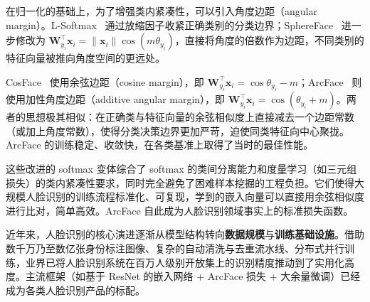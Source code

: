 在归一化的基础上，为了增强类内紧凑性，可以引入角度边距（angular margin）。L-Softmax~\cite{liu2017largemarginsoftmaxlossconvolutional} 通过放缩因子收紧正确类别的分类边界；SphereFace~\cite{liu2018spherefacedeephypersphereembedding} 进一步修改为 $\mathbf{W}_{y_i}^\top \mathbf{x}_i = \|\mathbf{x}_i\|\cos(m\theta_{y_i})$，直接将角度的倍数作为边距，不同类别的特征向量被推向角度空间的更远处。

CosFace~\cite{wang2018cosfacelargemargincosine} 使用余弦边距（cosine margin），即 $\mathbf{W}_{y_i}^\top \mathbf{x}_i = \cos\theta_{y_i} - m$；ArcFace~\cite{Deng_2022} 则使用加性角度边距（additive angular margin），即 $\mathbf{W}_{y_i}^\top \mathbf{x}_i = \cos(\theta_{y_i} + m)$。两者的思想极其相似：在正确类与特征向量的余弦相似度上直接减去一个边距常数（或加上角度常数），使得分类决策边界更加严苛，迫使同类特征向中心聚拢。ArcFace 的训练稳定、收敛快，在各类基准上取得了当时的最佳性能。

这些改进的 softmax 变体综合了 softmax 的类间分离能力和度量学习（如三元组损失）的类内紧凑性要求，同时完全避免了困难样本挖掘的工程负担。它们使得大规模人脸识别的训练流程标准化、可复现，学到的嵌入向量可以直接用余弦相似度进行比对，简单高效。ArcFace 自此成为人脸识别领域事实上的标准损失函数。

近年来，人脸识别的核心演进逐渐从模型结构转向\textbf{数据规模}与\textbf{训练基础设施}。借助数千万乃至数亿张身份标注图像、复杂的自动清洗与去重流水线、分布式并行训练，业界已将人脸识别系统在百万人级别开放集上的识别精度推动到了实用化高度。主流框架（如基于 ResNet 的嵌入网络 + ArcFace 损失 + 大余量微调）已经成为各类人脸识别产品的标配。
